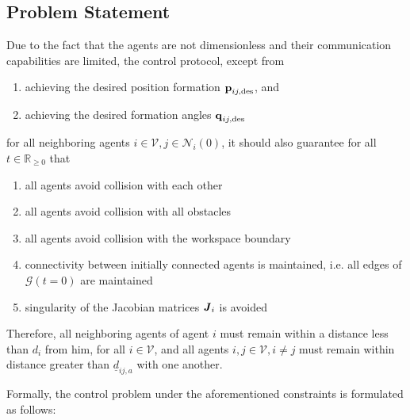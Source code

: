 \subsection{Problem Statement}
Due to the fact that the agents are not dimensionless and their communication
capabilities are limited, the control protocol, except from

\begin{enumerate}
  \item achieving the desired position formation $\bm{\mathbf{p}}_{ij, \text{des}}$, and
  \item achieving the desired formation angles $\bm{\mathbf{q}}_{ij, \text{des}}$
\end{enumerate}

for all neighboring agents $i \in \mathcal{V}, j \in \mathcal{N}_i(0)$,
it should also guarantee for all $t\in\mathbb{R}_{\geq 0}$ that

\begin{enumerate}
  \item all agents avoid collision with each other
  \item all agents avoid collision with all obstacles
  \item all agents avoid collision with the workspace boundary
  \item connectivity between initially connected agents is maintained,
    i.e. all edges of $\mathcal{G}(t=0)$ are maintained
  \item singularity of the Jacobian matrices $\bm{\mathit{J}}_i$ is avoided
\end{enumerate}

Therefore, all neighboring agents of agent $i$ must remain within a distance
less than $d_i$ from him, for all $i \in \mathcal{V}$,
and all agents $i, j\in \mathcal{V}, i \neq j$ must remain within distance
greater than $\underline{d}_{ij,a}$ with one another.

Formally, the control problem under the aforementioned constraints is
formulated as follows:

